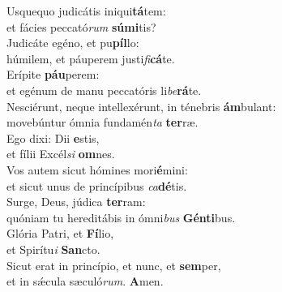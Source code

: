 \evenverse Usquequo judicátis iniqui\textbf{tá}tem:~\*\\
\evenverse et fácies peccató\textit{rum} \textbf{sú}\textbf{mi}tis?\\
\oddverse Judicáte egéno, et pu\textbf{píl}lo:~\*\\
\oddverse húmilem, et páuperem justi\textit{fi}\textbf{cá}te.\\
\evenverse Erípite \textbf{páu}perem:~\*\\
\evenverse et egénum de manu peccatóris li\textit{be}\textbf{rá}te.\\
\oddverse Nesciérunt, neque intellexérunt, in ténebris \textbf{ám}bulant:~\*\\
\oddverse movebúntur ómnia fundamén\textit{ta} \textbf{ter}ræ.\\
\evenverse Ego dixi: Dii \textbf{e}stis,~\*\\
\evenverse et fílii Excél\textit{si} \textbf{om}nes.\\
\oddverse Vos autem sicut hómines mori\textbf{é}mini:~\*\\
\oddverse et sicut unus de princípibus \textit{ca}\textbf{dé}tis.\\
\evenverse Surge, Deus, júdica \textbf{ter}ram:~\*\\
\evenverse quóniam tu hereditábis in ómni\textit{bus} \textbf{Gén}\textbf{ti}bus.\\
\oddverse Glória Patri, et \textbf{Fí}lio,~\*\\
\oddverse et Spirítu\textit{i} \textbf{San}cto.\\
\evenverse Sicut erat in princípio, et nunc, et \textbf{sem}per,~\*\\
\evenverse et in sǽcula sæculó\textit{rum}. \textbf{A}men.\\
